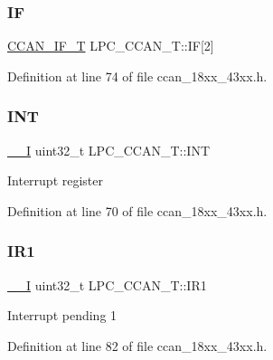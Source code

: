 \subsubsection{\texorpdfstring{IF}{IF}}
{\footnotesize\ttfamily \hyperlink{struct_c_c_a_n___i_f___t}{C\+C\+A\+N\+\_\+\+I\+F\+\_\+T} L\+P\+C\+\_\+\+C\+C\+A\+N\+\_\+\+T\+::\+IF\mbox{[}2\mbox{]}}



Definition at line 74 of file ccan\+\_\+18xx\+\_\+43xx.\+h.

\mbox{\label{struct_l_p_c___c_c_a_n___t_af2d2a4ff53c1a646150ecf46471261e2}} 
\subsubsection{\texorpdfstring{I\+NT}{INT}}
{\footnotesize\ttfamily \hyperlink{core__sc300_8h_af63697ed9952cc71e1225efe205f6cd3}{\+\_\+\+\_\+I} uint32\+\_\+t L\+P\+C\+\_\+\+C\+C\+A\+N\+\_\+\+T\+::\+I\+NT}

Interrupt register 

Definition at line 70 of file ccan\+\_\+18xx\+\_\+43xx.\+h.

\mbox{\label{struct_l_p_c___c_c_a_n___t_ac3eb366821bd7bfb635757ddd08226ab}} 
\subsubsection{\texorpdfstring{I\+R1}{IR1}}
{\footnotesize\ttfamily \hyperlink{core__sc300_8h_af63697ed9952cc71e1225efe205f6cd3}{\+\_\+\+\_\+I} uint32\+\_\+t L\+P\+C\+\_\+\+C\+C\+A\+N\+\_\+\+T\+::\+I\+R1}

Interrupt pending 1 

Definition at line 82 of file ccan\+\_\+18xx\+\_\+43xx.\+h.

\mbox{\label{struct_l_p_c___c_c_a_n___t_a22446f14231c8f7764ed3e0aa7272bc6}} 
